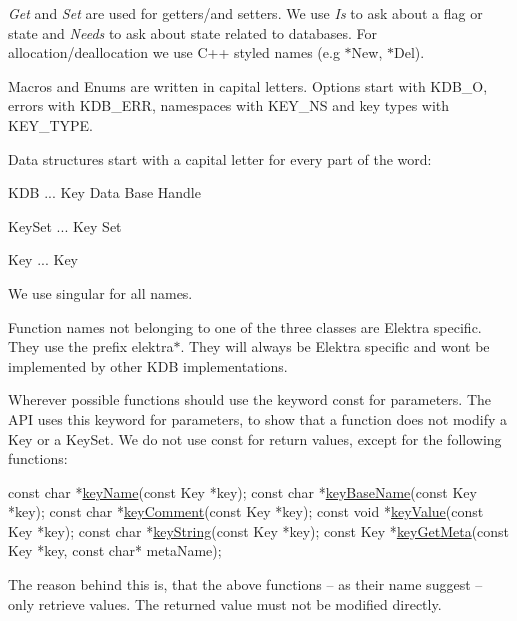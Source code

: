 {\itshape Get} and {\itshape Set} are used for getters/and setters. We use {\itshape Is} to ask about a flag or state and {\itshape Needs} to ask about state related to databases. For allocation/deallocation we use C++ styled names (e.\+g {\ttfamily $\ast$\+New}, {\ttfamily $\ast$\+Del}).

Macros and Enums are written in capital letters. Options start with {\ttfamily K\+D\+B\+\_\+O}, errors with {\ttfamily K\+D\+B\+\_\+\+E\+RR}, namespaces with {\ttfamily K\+E\+Y\+\_\+\+NS} and key types with {\ttfamily K\+E\+Y\+\_\+\+T\+Y\+PE}.

Data structures start with a capital letter for every part of the word\+:


\begin{DoxyItemize}
\item {\ttfamily K\+DB} ... Key Data Base Handle
\item {\ttfamily Key\+Set} ... Key Set
\item {\ttfamily Key} ... Key
\end{DoxyItemize}

We use singular for all names.

Function names not belonging to one of the three classes are Elektra specific. They use the prefix {\ttfamily elektra$\ast$}. They will always be Elektra specific and won\textquotesingle{}t be implemented by other K\+DB implementations.

Wherever possible functions should use the keyword {\ttfamily const} for parameters. The A\+PI uses this keyword for parameters, to show that a function does not modify a {\ttfamily Key} or a {\ttfamily Key\+Set}. We do not use {\ttfamily const} for return values, except for the following functions\+:


\begin{DoxyCode}
\textcolor{keyword}{const} \textcolor{keywordtype}{char} *\hyperlink{group__keyname_ga8e805c726a60da921d3736cda7813513}{keyName}(\textcolor{keyword}{const} Key *key);
\textcolor{keyword}{const} \textcolor{keywordtype}{char} *\hyperlink{group__keyname_gaaff35e7ca8af5560c47e662ceb9465f5}{keyBaseName}(\textcolor{keyword}{const} Key *key);
\textcolor{keyword}{const} \textcolor{keywordtype}{char} *\hyperlink{group__meta_gac89fd319783b3457db45b4c09e55274a}{keyComment}(\textcolor{keyword}{const} Key *key);
\textcolor{keyword}{const} \textcolor{keywordtype}{void} *\hyperlink{group__keyvalue_ga6f29609c5da53c6dc26a98678d5752af}{keyValue}(\textcolor{keyword}{const} Key *key);
\textcolor{keyword}{const} \textcolor{keywordtype}{char} *\hyperlink{group__keyvalue_ga880936f2481d28e6e2acbe7486a21d05}{keyString}(\textcolor{keyword}{const} Key *key);
\textcolor{keyword}{const} Key  *\hyperlink{group__keymeta_ga9ed3875495ddb3d8a8d29158a60a147c}{keyGetMeta}(\textcolor{keyword}{const} Key *key, \textcolor{keyword}{const} \textcolor{keywordtype}{char}* metaName);
\end{DoxyCode}


The reason behind this is, that the above functions – as their name suggest – only retrieve values. The returned value must not be modified directly. 